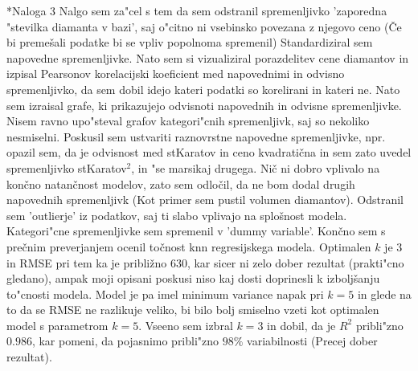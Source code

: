 \documentclass[a4paper, 10pt]{article}
\begin{document}
\begin{subsection}*{Naloga 3}
    Nalgo sem za"cel s tem da sem odstranil spremenljivko 'zaporedna "stevilka diamanta v bazi', saj 
    o"citno ni vsebinsko povezana z njegovo ceno (Če bi premešali podatke bi se vpliv popolnoma spremenil)
    Standardiziral sem napovedne spremenljivke. Nato sem si vizualiziral porazdelitev cene diamantov in izpisal 
    Pearsonov korelacijski koeficient med napovednimi in odvisno spremenljivko, da sem dobil idejo kateri podatki 
    so korelirani in kateri ne.
    Nato sem izraisal grafe, ki prikazujejo odvisnoti napovednih in odvisne spremenljivke. Nisem ravno upo"steval grafov kategori"cnih spremenljivk, saj so nekoliko nesmiselni. Poskusil sem ustvariti raznovrstne napovedne spremenljivke, npr. opazil
    sem, da je odvisnost med stKaratov in ceno kvadratična in sem zato uvedel spremenljivko stKaratov$^2$, in "se marsikaj drugega.
    Nič ni dobro vplivalo na končno natančnost modelov, zato sem odločil, da ne bom dodal drugih napovednih 
    spremenljivk (Kot primer sem pustil volumen diamantov).
    Odstranil sem 'outlierje' iz podatkov, saj ti slabo vplivajo na splošnost modela.
    Kategori"cne spremenljivke sem spremenil v 'dummy variable'. Končno sem s 
    prečnim preverjanjem ocenil točnost knn regresijskega modela.
    Optimalen $k$ je $3$ in RMSE pri tem ka je približno $630$, kar sicer ni zelo dober rezultat (prakti"cno gledano), ampak moji opisani poskusi
    niso kaj dosti doprinesli k izboljšanju to"cnosti modela. Model je pa imel minimum 
    variance napak pri $k=5$ in glede na to da se RMSE ne razlikuje veliko, bi bilo bolj smiselno vzeti
    kot optimalen model s parametrom $k=5$. Vseeno sem izbral $k=3$ in dobil, da je
    $R^2$ pribli"zno $0.986$, kar pomeni, da pojasnimo pribli"zno $98\%$ variabilnosti (Precej dober rezultat).
\end{subsection}
\end{document}
